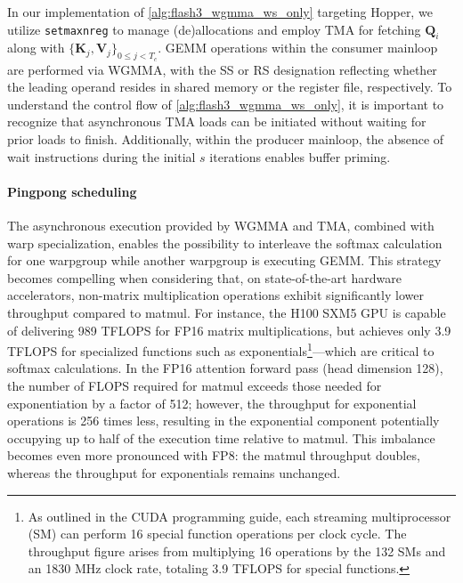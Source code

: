 \begin{enumerate}
In our implementation of \cref{alg:flash3_wgmma_ws_only} targeting Hopper, we utilize \verb|setmaxnreg| to manage (de)allocations and employ TMA for fetching $\mathbf{Q}_i$ along with $\{ \mathbf{K}_j, \mathbf{V}_j \}_{0 \leq j < T_c}$. GEMM operations within the consumer mainloop are performed via WGMMA, with the SS or RS designation reflecting whether the leading operand resides in shared memory or the register file, respectively. To understand the control flow of \cref{alg:flash3_wgmma_ws_only}, it is important to recognize that asynchronous TMA loads can be initiated without waiting for prior loads to finish. Additionally, within the producer mainloop, the absence of wait instructions during the initial $s$ iterations enables buffer priming.

\paragraph{Pingpong scheduling} The asynchronous execution provided by WGMMA and TMA, combined with warp specialization, enables the possibility to interleave the softmax calculation for one warpgroup while another warpgroup is executing GEMM. This strategy becomes compelling when considering that, on state-of-the-art hardware accelerators, non-matrix multiplication operations exhibit significantly lower throughput compared to matmul. For instance, the H100 SXM5 GPU is capable of delivering 989 TFLOPS for FP16 matrix multiplications, but achieves only 3.9 TFLOPS for specialized functions such as exponentials\footnote{As outlined in the CUDA programming guide, each streaming multiprocessor (SM) can perform 16 special function operations per clock cycle. The throughput figure arises from multiplying 16 operations by the 132 SMs and an 1830 MHz clock rate, totaling 3.9 TFLOPS for special functions.}—which are critical to softmax calculations. In the FP16 attention forward pass (head dimension 128), the number of FLOPS required for matmul exceeds those needed for exponentiation by a factor of 512; however, the throughput for exponential operations is 256 times less, resulting in the exponential component potentially occupying up to half of the execution time relative to matmul. This imbalance becomes even more pronounced with FP8: the matmul throughput doubles, whereas the throughput for exponentials remains unchanged.


\end{enumerate}
